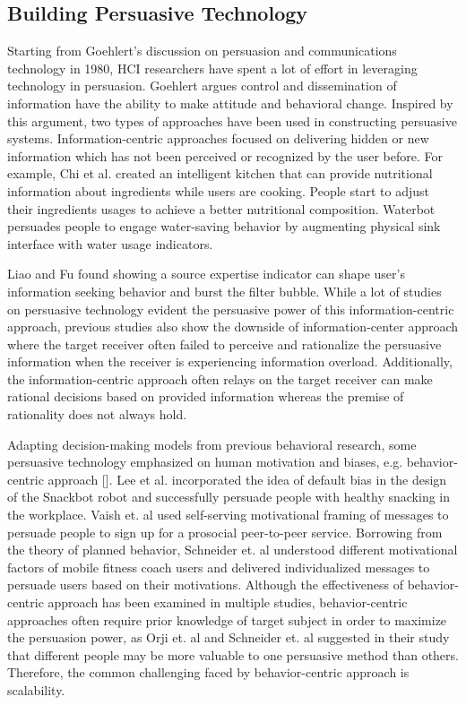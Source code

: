 \subsection{Building Persuasive Technology}
Starting from Goehlert's discussion on persuasion and communications technology in 1980, HCI researchers have spent a lot of effort in leveraging technology in persuasion. Goehlert argues control and dissemination of information have the ability to make attitude and behavioral change. Inspired by this argument, two types of approaches have been used in constructing persuasive systems. Information-centric approaches focused on delivering hidden or new information which has not been perceived or recognized by the user before. For example, Chi et al. created an intelligent kitchen that can provide nutritional information about ingredients while users are cooking. People start to adjust their ingredients usages to achieve a better nutritional composition. Waterbot persuades people to engage water-saving behavior by augmenting physical sink interface with water usage indicators.\par
Liao and Fu found showing a source expertise indicator can shape user's information seeking behavior and burst the filter bubble. While a lot of studies on persuasive technology evident the persuasive power of this information-centric approach, previous studies also show the downside of information-center approach where the target receiver often failed to perceive and rationalize the persuasive information when the receiver is experiencing information overload. Additionally, the information-centric approach often relays on the target receiver can make rational decisions based on provided information whereas the premise of rationality does not always hold.\par
Adapting decision-making models from previous behavioral research, some persuasive technology emphasized on human motivation and biases, e.g. behavior-centric approach []. Lee et al. incorporated the idea of default bias in the design of the Snackbot robot and successfully persuade people with healthy snacking in the workplace. Vaish et. al used self-serving motivational framing of messages to persuade people to sign up for a prosocial peer-to-peer service. Borrowing from the theory of planned behavior, Schneider et. al understood different motivational factors of mobile fitness coach users and delivered individualized messages to persuade users based on their motivations. Although the effectiveness of behavior-centric approach has been examined in multiple studies, behavior-centric approaches often require prior knowledge of target subject in order to maximize the persuasion power, as Orji et. al and Schneider et. al suggested in their study that different people may be more valuable to one persuasive method than others.  Therefore, the common challenging faced by behavior-centric approach is scalability.\par
